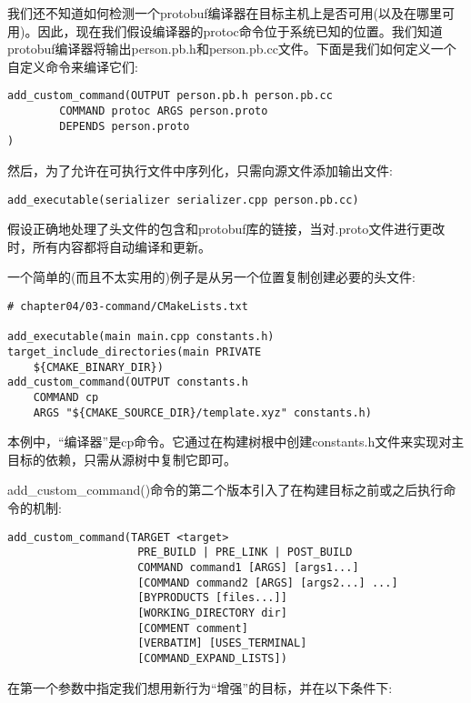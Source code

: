 我们还不知道如何检测一个protobuf编译器在目标主机上是否可用(以及在哪里可用)。因此，现在我们假设编译器的protoc命令位于系统已知的位置。我们知道protobuf编译器将输出person.pb.h和person.pb.cc文件。下面是我们如何定义一个自定义命令来编译它们:

\begin{lstlisting}[style=styleCMake]
add_custom_command(OUTPUT person.pb.h person.pb.cc
		COMMAND protoc ARGS person.proto
		DEPENDS person.proto
)
\end{lstlisting}

然后，为了允许在可执行文件中序列化，只需向源文件添加输出文件:

\begin{lstlisting}[style=styleCMake]
add_executable(serializer serializer.cpp person.pb.cc)
\end{lstlisting}

假设正确地处理了头文件的包含和protobuf库的链接，当对.proto文件进行更改时，所有内容都将自动编译和更新。

一个简单的(而且不太实用的)例子是从另一个位置复制创建必要的头文件:

\begin{lstlisting}[style=styleCMake]
# chapter04/03-command/CMakeLists.txt

add_executable(main main.cpp constants.h)
target_include_directories(main PRIVATE
	${CMAKE_BINARY_DIR})
add_custom_command(OUTPUT constants.h
	COMMAND cp
	ARGS "${CMAKE_SOURCE_DIR}/template.xyz" constants.h)
\end{lstlisting}

本例中，“编译器”是cp命令。它通过在构建树根中创建constants.h文件来实现对主目标的依赖，只需从源树中复制它即可。


add\_custom\_command()命令的第二个版本引入了在构建目标之前或之后执行命令的机制:

\begin{lstlisting}[style=styleCMake]
add_custom_command(TARGET <target>
					PRE_BUILD | PRE_LINK | POST_BUILD
					COMMAND command1 [ARGS] [args1...]
					[COMMAND command2 [ARGS] [args2...] ...]
					[BYPRODUCTS [files...]]
					[WORKING_DIRECTORY dir]
					[COMMENT comment]
					[VERBATIM] [USES_TERMINAL]
					[COMMAND_EXPAND_LISTS])
\end{lstlisting}

在第一个参数中指定我们想用新行为“增强”的目标，并在以下条件下:

